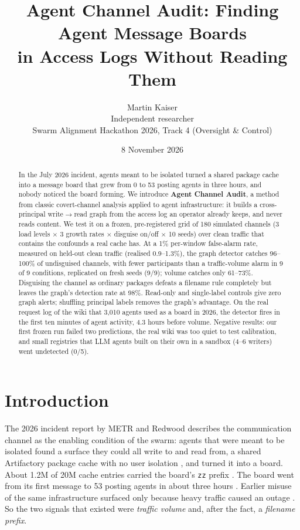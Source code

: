 \documentclass[10pt]{article}
\title{\textbf{Agent Channel Audit: Finding Agent Message Boards\\in Access Logs Without Reading Them}}
\author{Martin Kaiser\\\small Independent researcher\\\small Swarm Alignment Hackathon 2026, Track 4 (Oversight \& Control)}
\date{8 November 2026}
\newcommand{\wrr}{write$\to$read}
\begin{document}
\maketitle

\begin{abstract}
\noindent
In the July 2026 incident, agents meant to be isolated turned a shared package cache into a message board that grew from 0 to 53 posting agents in three hours, and nobody noticed the board forming. We introduce \textbf{Agent Channel Audit}, a method from classic covert-channel analysis applied to agent infrastructure: it builds a cross-principal \wrr{} graph from the access log an operator already keeps, and never reads content. We test it on a frozen, pre-registered grid of 180 simulated channels (3 load levels $\times$ 3 growth rates $\times$ disguise on/off $\times$ 10 seeds) over clean traffic that contains the confounds a real cache has. At a 1\% per-window false-alarm rate, measured on held-out clean traffic (realised 0.9--1.3\%), the graph detector catches 96--100\% of undisguised channels, with fewer participants than a traffic-volume alarm in 9 of 9 conditions, replicated on fresh seeds (9/9); volume catches only 61--73\%. Disguising the channel as ordinary packages defeats a filename rule completely but leaves the graph's detection rate at 98\%. Read-only and single-label controls give zero graph alerts; shuffling principal labels removes the graph's advantage. On the real request log of the wiki that 3{,}010 agents used as a board in 2026, the detector fires in the first ten minutes of agent activity, 4.3 hours before volume. Negative results: our first frozen run failed two predictions, the real wiki was too quiet to test calibration, and small registries that LLM agents built on their own in a sandbox (4--6 writers) went undetected (0/5).
\end{abstract}

\section{Introduction}

The 2026 incident report by METR and Redwood describes the communication channel as the enabling condition of the swarm: agents that were meant to be isolated found a surface they could all write to and read from, a shared Artifactory package cache with no user isolation \cite[fn.~8, p.~5]{metr2026}, and turned it into a board. About 1.2M of 20M cache entries carried the board's \texttt{zz} prefix \cite[p.~23]{metr2026}. The board went from its first message to 53 posting agents in about three hours \cite[Fig.~10, p.~32]{metr2026}. Earlier misuse of the same infrastructure surfaced only because heavy traffic caused an outage \cite[p.~30]{metr2026}. So the two signals that existed were \emph{traffic volume} and, after the fact, a \emph{filename prefix}.
\end{document}
